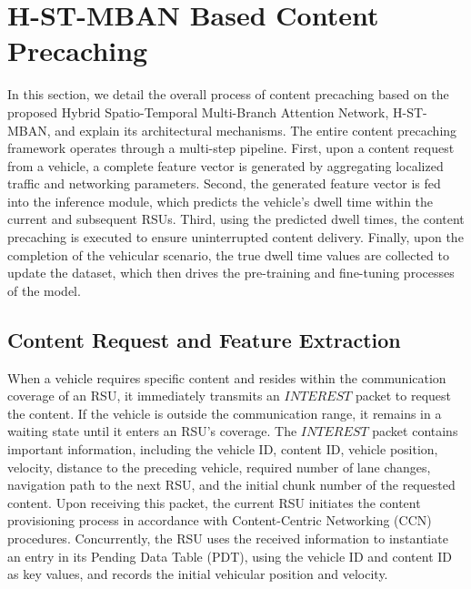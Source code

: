 \documentclass[journal]{IEEEtran}
\begin{document}
\section{H-ST-MBAN Based Content Precaching}\label{sec:architecture}

In this section, we detail the overall process of content precaching based on the proposed Hybrid Spatio-Temporal Multi-Branch Attention Network, H-ST-MBAN, and explain its architectural mechanisms. The entire content precaching framework operates through a multi-step pipeline. First, upon a content request from a vehicle, a complete feature vector is generated by aggregating localized traffic and networking parameters. Second, the generated feature vector is fed into the inference module, which predicts the vehicle's dwell time within the current and subsequent RSUs. Third, using the predicted dwell times, the content precaching is executed to ensure uninterrupted content delivery. Finally, upon the completion of the vehicular scenario, the true dwell time values are collected to update the dataset, which then drives the pre-training and fine-tuning processes of the model.

\subsection{Content Request and Feature Extraction}

When a vehicle requires specific content and resides within the communication coverage of an RSU, it immediately transmits an \(INTEREST\) packet to request the content. If the vehicle is outside the communication range, it remains in a waiting state until it enters an RSU's coverage. The \(INTEREST\) packet contains important information, including the vehicle ID, content ID, vehicle position, velocity, distance to the preceding vehicle, required number of lane changes, navigation path to the next RSU, and the initial chunk number of the requested content. Upon receiving this packet, the current RSU initiates the content provisioning process in accordance with Content-Centric Networking (CCN) procedures. Concurrently, the RSU uses the received information to instantiate an entry in its Pending Data Table (PDT), using the vehicle ID and content ID as key values, and records the initial vehicular position and velocity.
\end{document}
